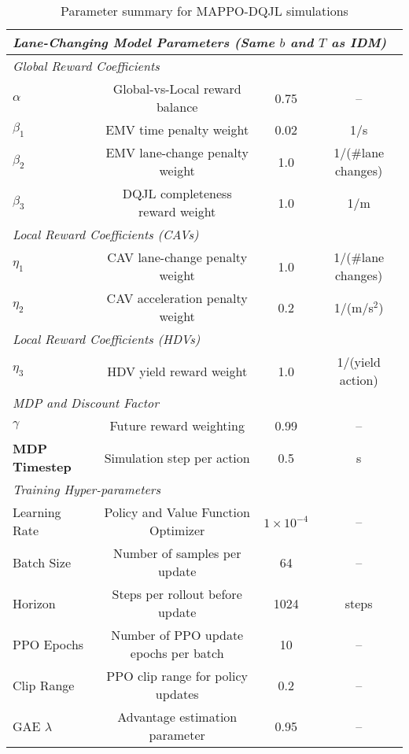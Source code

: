 \begin{table}[htbp]
\begin{tabular}{lccc}
\multicolumn{4}{l}{\textit{Lane-Changing Model Parameters (Same $b$ and $T$ as IDM)}} \\[6pt]
\midrule
\multicolumn{4}{l}{\textit{Global Reward Coefficients}} \\[6pt]
$\alpha$     & Global-vs-Local reward balance             & 0.75        & -- \\
$\beta_1$    & EMV time penalty weight                    & 0.02       & 1/s \\
$\beta_2$    & EMV lane-change penalty weight             & 1.0        & 1/(\#lane changes) \\
$\beta_3$    & DQJL completeness reward weight            & 1.0        & 1/m \\[6pt]
\midrule
\multicolumn{4}{l}{\textit{Local Reward Coefficients (CAVs)}} \\[6pt]
$\eta_1$     & CAV lane-change penalty weight             & 1.0        & 1/(\#lane changes) \\
$\eta_2$     & CAV acceleration penalty weight            & 0.2        & 1/(m/s$^2$) \\[6pt]
\midrule
\multicolumn{4}{l}{\textit{Local Reward Coefficients (HDVs)}} \\[6pt]
$\eta_3$     & HDV yield reward weight                    & 1.0        & 1/(yield action) \\[6pt]
\midrule
\multicolumn{4}{l}{\textit{MDP and Discount Factor}} \\[6pt]
$\gamma$     & Future reward weighting                    & 0.99       & -- \\
\textbf{MDP Timestep} & Simulation step per action        & 0.5        & s \\[6pt]
\midrule
\multicolumn{4}{l}{\textit{Training Hyper-parameters}} \\[6pt]
Learning Rate & Policy and Value Function Optimizer       & $1 \times 10^{-4}$ & -- \\
Batch Size    & Number of samples per update              & 64         & -- \\
Horizon       & Steps per rollout before update           & 1024       & steps \\
PPO Epochs    & Number of PPO update epochs per batch     & 10         & -- \\
Clip Range    & PPO clip range for policy updates         & 0.2        & -- \\
GAE $\lambda$ & Advantage estimation parameter            & 0.95       & -- \\
\bottomrule
\end{tabular}
\caption{Parameter summary for MAPPO-DQJL simulations}
\label{tab:parameters_summary}
\end{table}
